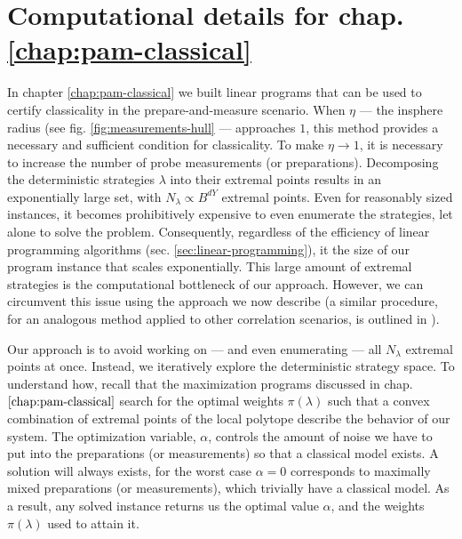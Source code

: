 \chapter{Computational details for chap. \ref{chap:pam-classical}}
\label{ap:a}
\label{ap:a-computational}

    In chapter \ref{chap:pam-classical} we built linear programs that can be used to certify classicality in the prepare-and-measure scenario. When $\eta$ --- the insphere radius (see fig. \ref{fig:measurements-hull} --- approaches $1$, this method provides a necessary and sufficient condition for classicality. To make $\eta \rightarrow 1$, it is necessary to increase the number of probe measurements (or preparations). Decomposing the deterministic strategies $\lambda$ into their extremal points results in an exponentially large set, with $N_\lambda \propto B^{dY}$ extremal points. Even for reasonably sized instances, it becomes prohibitively expensive to even enumerate the strategies, let alone to solve the problem. Consequently, regardless of the efficiency of linear programming algorithms (sec. \ref{sec:linear-programming}), it the size of our program instance that scales exponentially. This large amount of extremal strategies is the computational bottleneck of our approach. However, we can circumvent this issue using the approach we now describe (a similar procedure, for an analogous method applied to other correlation scenarios, is outlined in \cite{fillettaz_algorithmic_2018}).

	Our approach is to avoid working on --- and even enumerating --- all $N_\lambda$ extremal points at once. Instead, we iteratively explore the deterministic strategy space. To understand how, recall that the maximization programs discussed in chap. $\ref{chap:pam-classical}$ search for the optimal weights $\pi(\lambda)$ such that a convex combination of extremal points of the local polytope describe the behavior of our system. The optimization variable, $\alpha$, controls the amount of noise we have to put into the preparations (or measurements) so that a classical model exists. A solution will always exists, for the worst case $\alpha = 0$ corresponds to maximally mixed preparations (or measurements), which trivially have a classical model. As a result, any solved instance returns us the optimal value $\alpha$, and the weights $\pi(\lambda)$ used to attain it.

